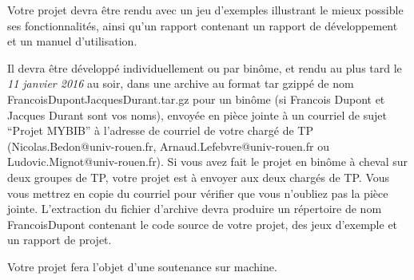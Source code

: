 \documentclass[10pt,a4wide,draft]{article}
\begin{document}
Votre projet devra être rendu avec un jeu d'exemples illustrant le mieux possible ses fonctionnalités, ainsi qu'un rapport contenant un rapport de développement et un manuel d'utilisation.

Il devra être développé individuellement ou par binôme, et rendu au plus tard le \emph{11 janvier 2016} au soir, dans une archive au format tar gzippé de nom FrancoisDupontJacquesDurant.tar.gz pour un binôme (si Francois Dupont et Jacques Durant sont vos noms), envoyée en pièce jointe à un courriel de sujet ``Projet MYBIB'' à l'adresse de courriel de votre chargé de TP (Nicolas.Bedon@univ-rouen.fr, Arnaud.Lefebvre@univ-rouen.fr ou Ludovic.Mignot@univ-rouen.fr). Si vous avez fait le projet en binôme à cheval sur deux groupes de TP, votre projet est à envoyer aux deux chargés de TP. Vous vous mettrez en copie du courriel pour vérifier que vous n'oubliez pas la pièce jointe. L'extraction du fichier d'archive devra produire un répertoire de nom FrancoisDupont contenant le code source de votre projet, des jeux d'exemple et un rapport de projet.

Votre projet fera l'objet d'une soutenance sur machine.

\nocite{BM:2015}
 

\end{document}

